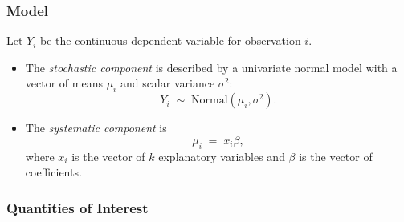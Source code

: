 \subsubsection{Model}
Let $Y_i$ be the continuous dependent variable for observation $i$.
\begin{itemize}
\item The \emph{stochastic component} is described by a univariate normal
  model with a vector of means $\mu_i$ and scalar variance $\sigma^2$:
  \begin{equation*}
    Y_i \; \sim \; \textrm{Normal}(\mu_i, \sigma^2). 
  \end{equation*}

\item The \emph{systematic component} is 
  \begin{equation*}
    \mu_i \;= \; x_i \beta,
  \end{equation*}
  where $x_i$ is the vector of $k$ explanatory variables and $\beta$ is
  the vector of coefficients.
\end{itemize}


\subsubsection{Quantities of Interest}

